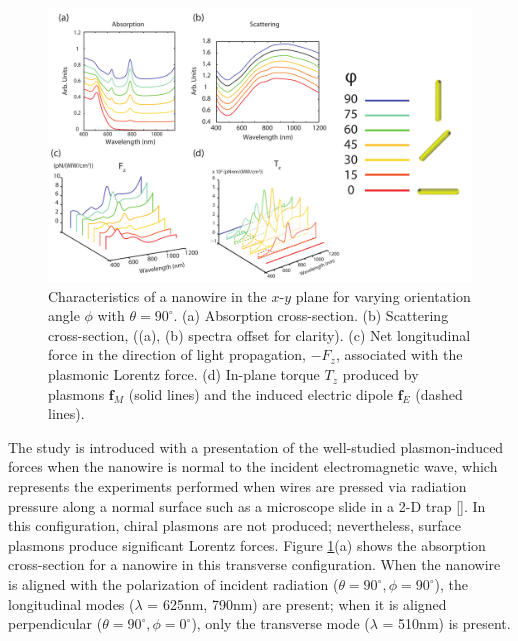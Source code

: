 \begin{figure}[ht]
\centering\includegraphics[width=\textwidth]{ScattAbsorptionF_zT_z.pdf}
\caption{Characteristics of a nanowire in the $x$-$y$ plane for varying orientation angle $\phi$ with $\theta = 90^\circ$. (a) Absorption cross-section. (b) Scattering cross-section, ((a), (b) spectra offset for clarity). (c) Net longitudinal force in the direction of light propagation, $-F_z$,  associated with the plasmonic Lorentz force. (d) In-plane torque $T_z$ produced by plasmons $\mathbf{f}_M$ (solid lines) and the induced electric dipole $\mathbf{f}_E$ (dashed lines).}\label{absorption}
\end{figure}

The study is introduced with a presentation of the well-studied plasmon-induced forces when the nanowire is normal to the incident electromagnetic wave, which represents the experiments performed when wires are pressed via radiation pressure along a normal surface such as a microscope slide in a 2-D trap [\cite{Tong}]. In this configuration, chiral plasmons are not produced; nevertheless, surface plasmons produce significant Lorentz forces.  Figure \ref{absorption}(a) shows the absorption cross-section for a nanowire in this transverse configuration. When the nanowire is aligned with the polarization of incident radiation ($\theta = 90^\circ, \phi = 90^\circ$), the longitudinal modes ($\lambda$ = 625nm, 790nm) are present; when it is aligned perpendicular ($\theta = 90^\circ, \phi = 0^\circ$), only the transverse mode ($\lambda$ = 510nm) is present.

